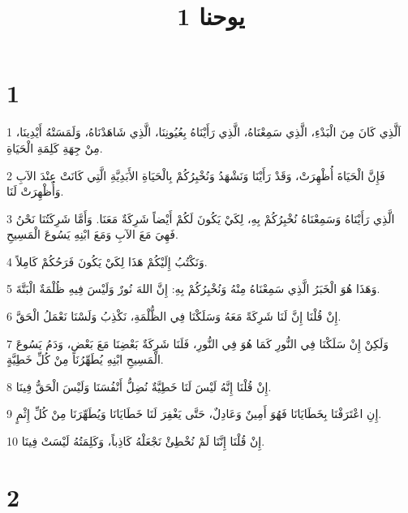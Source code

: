 

\title{1 يوحنا}


\chapter{1}

\par 1 اَلَّذِي كَانَ مِنَ الْبَدْءِ، الَّذِي سَمِعْنَاهُ، الَّذِي رَأَيْنَاهُ بِعُيُونِنَا، الَّذِي شَاهَدْنَاهُ، وَلَمَسَتْهُ أَيْدِينَا، مِنْ جِهَةِ كَلِمَةِ الْحَيَاةِ.
\par 2 فَإِنَّ الْحَيَاةَ أُظْهِرَتْ، وَقَدْ رَأَيْنَا وَنَشْهَدُ وَنُخْبِرُكُمْ بِالْحَيَاةِ الأَبَدِيَّةِ الَّتِي كَانَتْ عِنْدَ الآبِ وَأُظْهِرَتْ لَنَا.
\par 3 الَّذِي رَأَيْنَاهُ وَسَمِعْنَاهُ نُخْبِرُكُمْ بِهِ، لِكَيْ يَكُونَ لَكُمْ أَيْضاً شَرِكَةٌ مَعَنَا. وَأَمَّا شَرِكَتُنَا نَحْنُ فَهِيَ مَعَ الآبِ وَمَعَ ابْنِهِ يَسُوعَ الْمَسِيحِ.
\par 4 وَنَكْتُبُ إِلَيْكُمْ هَذَا لِكَيْ يَكُونَ فَرَحُكُمْ كَامِلاً.
\par 5 وَهَذَا هُوَ الْخَبَرُ الَّذِي سَمِعْنَاهُ مِنْهُ وَنُخْبِرُكُمْ بِهِ: إِنَّ اللهَ نُورٌ وَلَيْسَ فِيهِ ظُلْمَةٌ الْبَتَّةَ.
\par 6 إِنْ قُلْنَا إِنَّ لَنَا شَرِكَةً مَعَهُ وَسَلَكْنَا فِي الظُّلْمَةِ، نَكْذِبُ وَلَسْنَا نَعْمَلُ الْحَقَّ.
\par 7 وَلَكِنْ إِنْ سَلَكْنَا فِي النُّورِ كَمَا هُوَ فِي النُّورِ، فَلَنَا شَرِكَةٌ بَعْضِنَا مَعَ بَعْضٍ، وَدَمُ يَسُوعَ الْمَسِيحِ ابْنِهِ يُطَهِّرُنَا مِنْ كُلِّ خَطِيَّةٍ.
\par 8 إِنْ قُلْنَا إِنَّهُ لَيْسَ لَنَا خَطِيَّةٌ نُضِلُّ أَنْفُسَنَا وَلَيْسَ الْحَقُّ فِينَا.
\par 9 إِنِ اعْتَرَفْنَا بِخَطَايَانَا فَهُوَ أَمِينٌ وَعَادِلٌ، حَتَّى يَغْفِرَ لَنَا خَطَايَانَا وَيُطَهِّرَنَا مِنْ كُلِّ إِثْمٍ.
\par 10 إِنْ قُلْنَا إِنَّنَا لَمْ نُخْطِئْ نَجْعَلْهُ كَاذِباً، وَكَلِمَتُهُ لَيْسَتْ فِينَا.

\chapter{2}

